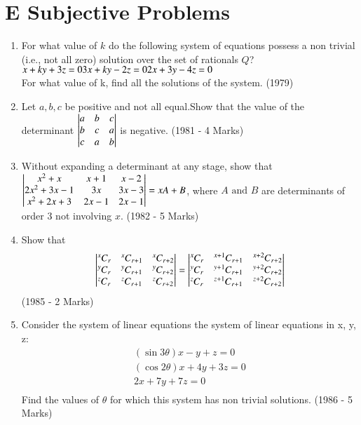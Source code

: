 \documentclass[journal,12pt,twocolumn]{IEEEtran}
\newcommand\Comb[2][^n]{\prescript{#1\mkern-0.5mu}{}C_{#2}}
\theoremstyle{remark}
\begin{document}
\section{E Subjective Problems}
\begin{enumerate}
\item For what value of $k$ do the following system of equations possess a non trivial (i.e., not all zero) solution over the set of rationals $Q$?\\
$x+ky+3z=0\\3x+ky-2z=0\\2x+3y-4z=0$\\ For what value of k, find all the solutions of the system. \hfill (1979)\\[2pt]

\item Let $a,b,c$ be positive and not all equal.Show that the value of the determinant $\begin{vmatrix}a&b&c\\b&c&a\\c&a&b\end{vmatrix}$ is negative. \hfill (1981 - 4 Marks)\\[2pt]

\item Without expanding a determinant at any stage, show that $\begin{vmatrix}x^2+x&x+1&x-2\\2x^2+3x-1&3x&3x-3\\x^2+2x+3&2x-1&2x-1\end{vmatrix}=xA+B$, where $A\text{ and }B$ are determinants of order 3 not involving $x$. \hfill (1982 - 5 Marks)\\[2pt]

\item Show that $$\mydet{\Comb[x]{r}&\Comb[x]{r+1}&\Comb[x]{r+2}\\\Comb[y]{r}&\Comb[y]{r+1}&\Comb[y]{r+2}\\\Comb[z]{r}&\Comb[z]{r+1}&\Comb[z]{r+2}}=\mydet{\Comb[x]{r}&\Comb[x+1]{r+1}&\Comb[x+2]{r+2}\\\Comb[y]{r}&\Comb[y+1]{r+1}&\Comb[y+2]{r+2}\\\Comb[z]{r}&\Comb[z+1]{r+1}&\Comb[z+2]{r+2}}$$ \hfill (1985 - 2 Marks)\\[2pt]

\item Consider the system of linear equations the system of linear equations in x, y, z:\\\begin{align*}(\sin 3\theta) x-y+z=0\\(\cos 2\theta)x+4y+3z=0\\2x+7y+7z=0\\\end{align*} Find the values of $\theta$ for which this system has non trivial solutions. \hfill (1986 - 5 Marks)\\[2pt]


\end{enumerate}
\end{document}

